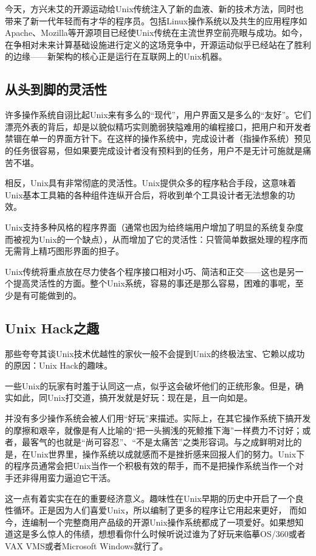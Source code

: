 \documentclass[11pt,oneside]{book}
\begin{document}
\begin{common-format}
今天，方兴未艾的开源运动给Unix传统注入了新的血液、新的技术方法，同时也带来了新一代年轻而有才华的程序员。包括Linux操作系统以及共生的应用程序如Apache、Mozilla等开源项目已经使Unix传统在主流世界空前亮眼与成功。如今，在争相对未来计算基础设施进行定义的这场竞争中，开源运动似乎已经站在了胜利的边缘——新架构的核心正是运行在互联网上的Unix机器。

\subsection{从头到脚的灵活性}
许多操作系统自诩比起Unix来有多么的“现代”，用户界面又是多么的“友好”。它们漂亮外表的背后，却是以貌似精巧实则脆弱狭隘难用的编程接口，把用户和开发者禁锢在单一的界面方针下。在这样的操作系统中，完成设计者（指操作系统）预见的任务很容易，但如果要完成设计者没有预料到的任务，用户不是无计可施就是痛苦不堪。

相反，Unix具有非常彻底的灵活性。Unix提供众多的程序粘合手段，这意味着Unix基本工具箱的各种组件连纵开合后，将收到单个工具设计者无法想象的功效。

Unix支持多种风格的程序界面（通常也因为给终端用户增加了明显的系统复杂度而被视为Unix的一个缺点），从而增加了它的灵活性：只管简单数据处理的程序而无需背上精巧图形界面的担子。

Unix传统将重点放在尽力使各个程序接口相对小巧、简洁和正交——这也是另一个提高灵活性的方面。整个Unix系统，容易的事还是那么容易，困难的事呢，至少是有可能做到的。

\subsection{Unix Hack之趣}
那些夸夸其谈Unix技术优越性的家伙一般不会提到Unix的终极法宝、它赖以成功的原因：Unix Hack的趣味。

一些Unix的玩家有时羞于认同这一点，似乎这会破坏他们的正统形象。但是，确实如此，同Unix打交道，搞开发就是好玩：现在是，且一向如是。

并没有多少操作系统会被人们用“好玩”来描述。实际上，在其它操作系统下搞开发的摩擦和艰辛，就像是有人比喻的“把一头搁浅的死鲸推下海”一样费力不讨好；或者，最客气的也就是“尚可容忍”、“不是太痛苦”之类形容词。与之成鲜明对比的是，在Unix世界里，操作系统以成就感而不是挫折感来回报人们的努力。Unix下的程序员通常会把Unix当作一个积极有效的帮手，而不是把操作系统当作一个对手还非得用蛮力逼迫它干活。

这一点有着实实在在的重要经济意义。趣味性在Unix早期的历史中开启了一个良性循环。正是因为人们喜爱Unix，所以编制了更多的程序让它用起来更好，  而如今，连编制一个完整商用产品级的开源Unix操作系统都成了一项爱好。如果想知道这是多么惊人的伟绩，想想看你什么时候听说过谁为了好玩来临摹OS/360或者VAX VMS或者Microsoft Windows就行了。


\end{common-format}
\end{document}
